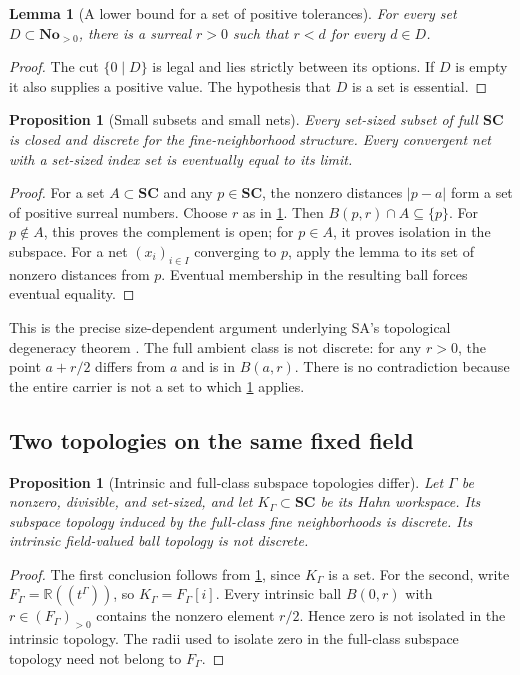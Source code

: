 \documentclass[11pt,letterpaper]{article}
\newtheorem{proposition}[theorem]{Proposition}
\newtheorem{lemma}[theorem]{Lemma}
\theoremstyle{definition}
\theoremstyle{remark}
\newcommand{\No}{\mathbf{No}}
\newcommand{\SC}{\mathbf{SC}}
\newcommand{\R}{\mathbb R}
\numberwithin{equation}{section}
\begin{document}
\begin{lemma}[A lower bound for a set of positive tolerances]\label{lem:smallradius}
For every set \(D\subset\No_{>0}\), there is a surreal \(r>0\) such that \(r<d\) for every \(d\in D\).
\end{lemma}
\begin{proof}
The cut \(\{0\mid D\}\) is legal and lies strictly between its options. If \(D\) is empty it also supplies a positive value. The hypothesis that \(D\) is a set is essential.
\end{proof}

\begin{proposition}[Small subsets and small nets]\label{prop:discrete}
Every set-sized subset of full \(\SC\) is closed and discrete for the fine-neighborhood structure. Every convergent net with a set-sized index set is eventually equal to its limit.
\end{proposition}
\begin{proof}
For a set \(A\subset\SC\) and any \(p\in\SC\), the nonzero distances \(|p-a|\) form a set of positive surreal numbers. Choose \(r\) as in \cref{lem:smallradius}. Then \(B(p,r)\cap A\subseteq\{p\}\). For \(p\notin A\), this proves the complement is open; for \(p\in A\), it proves isolation in the subspace. For a net \((x_i)_{i\in I}\) converging to \(p\), apply the lemma to its set of nonzero distances from \(p\). Eventual membership in the resulting ball forces eventual equality.
\end{proof}

This is the precise size-dependent argument underlying SA's topological degeneracy theorem \cite[\S3]{SA}. The full ambient class is not discrete: for any \(r>0\), the point \(a+r/2\) differs from \(a\) and is in \(B(a,r)\). There is no contradiction because the entire carrier is not a set to which \cref{prop:discrete} applies.

\subsection{Two topologies on the same fixed field}
\begin{proposition}[Intrinsic and full-class subspace topologies differ]\label{prop:twotopologies}
Let \(\Gamma\) be nonzero, divisible, and set-sized, and let \(K_\Gamma\subset\SC\) be its Hahn workspace. Its subspace topology induced by the full-class fine neighborhoods is discrete. Its intrinsic field-valued ball topology is not discrete.
\end{proposition}
\begin{proof}
The first conclusion follows from \cref{prop:discrete}, since \(K_\Gamma\) is a set. For the second, write \(F_\Gamma=\R((t^\Gamma))\), so \(K_\Gamma=F_\Gamma[i]\). Every intrinsic ball \(B(0,r)\) with \(r\in(F_\Gamma)_{>0}\) contains the nonzero element \(r/2\). Hence zero is not isolated in the intrinsic topology. The radii used to isolate zero in the full-class subspace topology need not belong to \(F_\Gamma\).
\end{proof}
\end{document}
